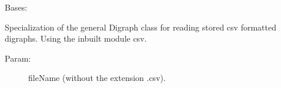 \documentclass[letterpaper,10pt,english]{sphinxmanual}
\begin{document}

\begin{fulllineitems}
\label{techDoc:digraphs.CSVDigraph}
Bases: {\hyperref[techDoc:digraphs.Digraph]{}}

Specialization of the general Digraph class for reading
stored csv formatted digraphs. Using the inbuilt module csv.
\begin{description}
\item[{Param:}] \leavevmode
fileName (without the extension .csv).

\end{description}

\begin{fulllineitems}
\label{techDoc:digraphs.CSVDigraph.showAll}
\end{fulllineitems}


\end{fulllineitems}

\end{document}
